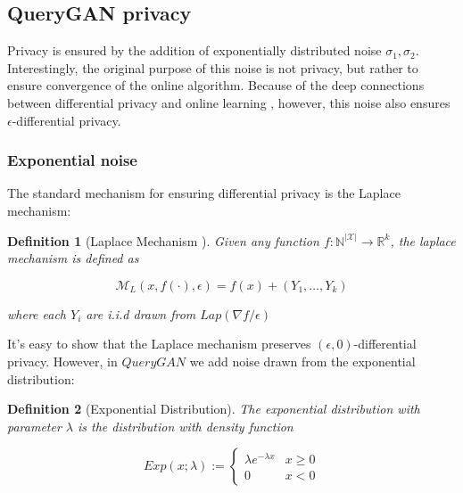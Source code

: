 \documentclass[]{article}
\newtheorem{definition}{Definition}[section]
\theoremstyle{definition}
\begin{document}

\subsection{QueryGAN privacy}
Privacy is ensured by the addition of exponentially distributed noise $\sigma_1, \sigma_2$. Interestingly, the original purpose of this noise is not privacy, but rather to ensure convergence of the online algorithm. Because of the deep connections between differential privacy and online learning \cite{NRVW19} \cite{GHM19}, however, this noise also ensures $\epsilon$-differential privacy. 

\subsubsection{Exponential noise}

The standard mechanism for ensuring differential privacy is the Laplace mechanism:

\begin{definition}[Laplace Mechanism \cite{DR13}]
    Given any function $f: \mathbb{N}^{|\mathcal{X}|} \to \mathbb{R}^k$, the laplace mechanism is defined as

    \begin{equation}
        \mathcal{M}_L(x, f(\cdot), \epsilon)=f(x)+\left(Y_1, \ldots, Y_k\right)
    \end{equation}

    where each $Y_i$ are i.i.d drawn from $Lap(\nabla f / \epsilon)$
\end{definition}

It's easy to show that the Laplace mechanism preserves $(\epsilon, 0)$-differential privacy. However, in $QueryGAN$ we add noise drawn from the exponential distribution:

\begin{definition}[Exponential Distribution]
    The exponential distribution with parameter $\lambda$ is the distribution with density function

    \begin{equation}
        Exp(x; \lambda) := \left\{\begin{array}{ll}{\lambda e^{-\lambda x}} & {x \geq 0} \\ {0} & {x<0}\end{array}\right.
    \end{equation}
\end{definition}
\end{document}
